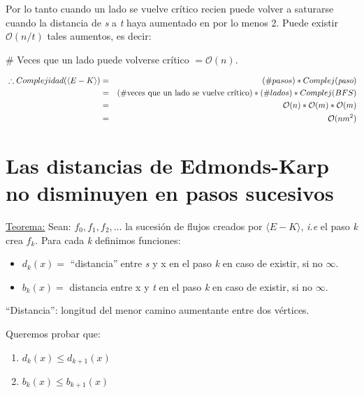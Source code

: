 \documentclass[12pt,a4paper]{report}
\begin{document}
		Por lo tanto cuando un lado se vuelve crítico recien puede volver a saturarse cuando la distancia de \textit{s} a \textit{t} haya aumentado en por lo menos 2. Puede existir $\mathcal{O}(n/t)$ tales aumentos, es decir:
		
		\begin{center}
			\# Veces que un lado puede volverse crítico $= \mathcal{O}(n)$. 
		\end{center}				
		
		\begin{eqnarray}
			 \nonumber \; \therefore Complejidad(\langle E-K \rangle) &=& (\# pasos) * Complej(\textit{paso}) \\
			 \nonumber &=& (\# \textup{veces que un lado se vuelve crítico}) * (\# lados) * Complej(BFS) \\
			\nonumber  &=& \mathcal{O}(n) * \mathcal{O}(m)* \mathcal{O}(m) \\
			\nonumber &=& \mathcal{O}(nm^{2})
		\end{eqnarray}
			
		
	\section{Las distancias de Edmonds-Karp no disminuyen en pasos sucesivos}
		\underline{Teorema:} Sean: $f_{0}, f_{1}, f_{2}, \dotsc$ \;  la sucesión de flujos creados por $\langle E-K \rangle$, \textit{i.e} el paso \textit{k} crea $f_{k}$. Para cada \textit{k} definimos funciones:
		
		\begin{itemize}
			\item $d_{k}(x) =$ \textquotedblleft distancia\textquotedblright$\;$entre \textit{s} y x en el paso \textit{k} en caso de existir, si no $\infty$.
			\item $b_{k}(x) =$ distancia entre x y \textit{t} en el paso \textit{k} en caso de existir, si no $\infty$.
		\end{itemize}
	
		\textquotedblleft Distancia\textquotedblright: longitud del menor camino aumentante entre dos vértices.
		
		\vspace{5mm}
		Queremos probar que:
		\begin{enumerate}
			\item $d_{k}(x) \leq d_{k+1}(x)$
			\item $b_{k}(x) \leq b_{k+1}(x)$
		\end{enumerate}
		
\end{document}
